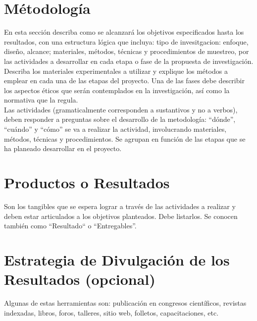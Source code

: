 \documentclass[12pt,a4paper]{article}
\begin{document}
\section{Métodología}
\noindent
En esta sección describa como se alcanzará los objetivos especificados hasta los
resultados, con una estructura lógica que incluya: tipo de invesitgacion: enfoque, diseño, alcance; materiales, métodos, técnicas y
procedimientos de muestreo, por las actividades a desarrollar en cada etapa o fase de la propuesta de
investigación. Describa los materiales experimentales a utilizar y explique los métodos a
emplear en cada una de las etapas del proyecto. Una de las fases debe describir los
aspectos éticos que serán contemplados en la investigación, así como la normativa que
la regula.\\

Las actividades (gramaticalmente corresponden a sustantivos y no a verbos), deben
responder a preguntas sobre el desarrollo de la metodología: “dónde”, “cuándo” y “cómo”
se va a realizar la actividad, involucrando materiales, métodos, técnicas y
procedimientos. Se agrupan en función de las etapas que se ha planeado desarrollar en
el proyecto.


\section{Productos o Resultados}
\noindent
Son los tangibles que se espera lograr a través de las actividades a realizar y deben estar
articulados a los objetivos planteados. Debe listarlos. Se conocen
también como “Resultado“ o “Entregables”.

\section{Estrategia de Divulgación de los Resultados (opcional)}
\noindent
Algunas de estas herramientas son: publicación en congresos científicos, revistas
indexadas, libros, foros, talleres, sitio web, folletos, capacitaciones, etc. \\
\end{document}
